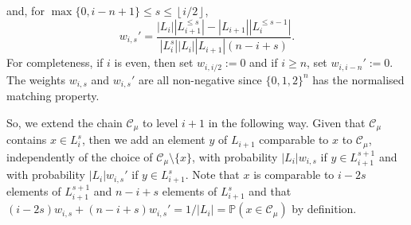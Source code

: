 \documentclass[11 pt]{article}
\theoremstyle{definition}
\theoremstyle{case}
\numberwithin{equation}{section}
\begin{document}
and, for $\max\{0,i-n+1\}\leq s\leq \left\lfloor i/2\right\rfloor$, 
\begin{equation}\label{w'Expression}w_{i,s}'=\frac{\left|L_i\right|\left|L_{i+1}^{\leq s}\right| - \left|L_{i+1}\right|\left|L_i^{\leq s-1}\right|}{\left|L_i^s\right|\left|L_i\right|\left|L_{i+1}\right|(n-i+s)}.\end{equation}
For completeness, if $i$ is even, then set $w_{i,i/2}:=0$ and if $i\geq n$, set $w_{i,i-n}':=0$. The weights $w_{i,s}$ and $w_{i,s}'$ are all non-negative since $\{0,1,2\}^n$ has the normalised matching property.  

So, we extend the chain $\mathcal{C}_\mu$ to level $i+1$ in the following way. Given that $\mathcal{C}_\mu$ contains $x\in L_i^s$, then we add an element $y$ of $L_{i+1}$ comparable to $x$ to $\mathcal{C}_\mu$, independently of the choice of $\mathcal{C}_\mu\setminus\{x\}$, with probability $|L_i|w_{i,s}$ if $y\in L_{i+1}^{s+1}$ and with probability $|L_i|w_{i,s}'$ if $y\in L_{i+1}^s$. Note that $x$ is comparable to $i-2s$ elements of $L_{i+1}^{s+1}$ and $n-i+s$ elements of $L_{i+1}^s$ and that $(i-2s)w_{i,s} + (n-i+s)w_{i,s}'=1/|L_i| = \mathbb{P}(x\in\mathcal{C}_\mu)$ by definition. 
\end{document}
